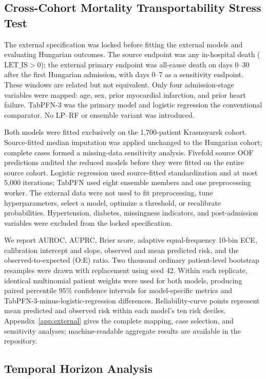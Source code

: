 \documentclass{ieeeaccess}
\begin{document}
\subsection{Cross-Cohort Mortality Transportability Stress Test}
\label{sec:external_methods}

The external specification was locked before fitting the external models and evaluating Hungarian outcomes. The source endpoint was any in-hospital death ($\mathrm{LET\_IS}>0$); the external primary endpoint was all-cause death on days 0--30 after the first Hungarian admission, with days 0--7 as a sensitivity endpoint. These windows are related but not equivalent. Only four admission-stage variables were mapped: age, sex, prior myocardial infarction, and prior heart failure. TabPFN-3 was the primary model and logistic regression the conventional comparator. No LP--RF or ensemble variant was introduced.

Both models were fitted exclusively on the 1,700-patient Krasnoyarsk cohort. Source-fitted median imputation was applied unchanged to the Hungarian cohort; complete cases formed a missing-data sensitivity analysis. Fivefold source OOF predictions audited the reduced models before they were fitted on the entire source cohort. Logistic regression used source-fitted standardization and at most 5,000 iterations; TabPFN used eight ensemble members and one preprocessing worker. The external data were not used to fit preprocessing, tune hyperparameters, select a model, optimize a threshold, or recalibrate probabilities. Hypertension, diabetes, missingness indicators, and post-admission variables were excluded from the locked specification.

We report AUROC, AUPRC, Brier score, adaptive equal-frequency 10-bin ECE, calibration intercept and slope, observed and mean predicted risk, and the observed-to-expected (O:E) ratio. Two thousand ordinary patient-level bootstrap resamples were drawn with replacement using seed 42. Within each replicate, identical multinomial patient weights were used for both models, producing paired percentile 95\% confidence intervals for model-specific metrics and TabPFN-3-minus-logistic-regression differences. Reliability-curve points represent mean predicted and observed risk within each model's ten risk deciles. Appendix~\ref{app:external} gives the complete mapping, case selection, and sensitivity analyses; machine-readable aggregate results are available in the repository.

\subsection{Temporal Horizon Analysis}
\end{document}

